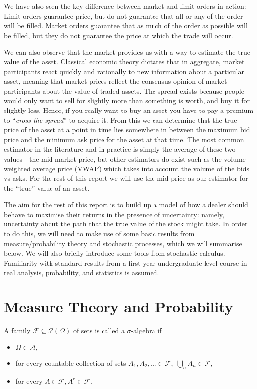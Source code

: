 We have also seen the key difference between market and limit orders in action: Limit 
orders guarantee price, but do not guarantee that all or any of the order will be 
filled. Market orders guarantee that as much of the order as possible will be filled, 
but they do not guarantee the price at which the trade will occur.

We can also observe that the market provides us with a way to estimate the true value 
of the asset. Classical economic theory dictates that in aggregate, market participants 
react quickly and rationally to new information about a particular asset, meaning that 
market prices reflect the consensus opinion of market participants about the value of 
traded assets. The spread exists because people would only want to sell for slightly 
more than something is worth, and buy it for slightly less. Hence, if you really want 
to buy an asset you have to pay a premium to ``\textit{cross the spread}'' to acquire 
it. From this we can determine that the true price of the asset at a point in time 
lies somewhere in between the maximum bid price and the minimum ask price for the asset 
at that time. The most common estimator in the literature and in practice is simply 
the average of these two values - the mid-market price, but other estimators do exist 
such as the volume-weighted average price (VWAP) which takes into account the volume 
of the bids vs asks. For the rest of this report we will use the mid-price as our 
estimator for the ``true'' value of an asset.

The aim for the rest of this report is to build up a model of how a dealer should 
behave to maximise their returns in the presence of uncertainty: namely, uncertainty 
about the path that the true value of the stock might take. In order to do this, we 
will need to make use of some basic results from measure/probability theory and 
stochastic processes, which we will summarise below. We will also briefly introduce 
some tools from stochastic calculus. Familiarity with standard results from a 
first-year undergraduate level course in real analysis, probability, and statistics 
is assumed.

\section{Measure Theory and Probability}

\begin{definition}
    A family $\mathcal{F}\subseteq\mathcal{P}(\Omega)$ of sets is called a $\sigma$-algebra if 
    \begin{itemize}
        \item $\Omega\in\mathcal{A},$
        \item for every countable collection of sets $A_1,A_2,...\in\mathcal{F},\;\bigcup_{n}A_n\in\mathcal{F},$
        \item for every $A\in\mathcal{F}, A^{\mathrm c}\in\mathcal{F}.$
    \end{itemize}
\end{definition}

